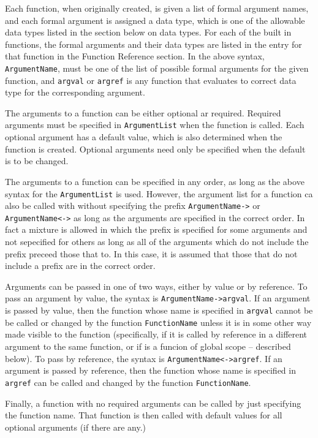 Each function, when originally created, is given a list of formal
argument names, and each formal argument is assigned a data type,
which is one of the allowable data types listed in the section below
on data types.  For each of the built in functions, the formal
arguments and their data types are listed in the entry for that
function in the Function Reference section.  In the above syntax,
\verb+ArgumentName+, must be one of the list of possible formal
arguments for the given function, and \verb+argval+ or \verb+argref+
is any function that evaluates to correct data type for the
corresponding argument. 

The arguments to a function can be either optional ar required.
Required arguments must be specified in \verb+ArgumentList+ when the
function is called.  Each optional argument has a default value, which
is also determined when the function is created.  Optional arguments
need only be specified when the default is to be changed.

The arguments to a function can be specified in any order, as long as
the above syntax for the \verb+ArgumentList+ is used.  However, the
argument list for a function ca also be called with without specifying
the prefix \verb+ArgumentName->+ or \verb+ArgumentName<->+ as long as
the arguments are specified in the correct order.  In fact a mixture
is allowed in which the prefix is specified for some arguments and not
sepecified for others as long as all of the arguments which do not
include the prefix preceed those that to.  In this case, it is assumed
that those that do not include a prefix are in the correct order.  

Arguments can be passed in one of two ways, either by value or by
reference.  To pass an argument by value, the syntax is
\verb+ArgumentName->argval+.  If an argument is passed by value, then the
function whose name is specified in \verb+argval+ cannot be be called
or changed by the function \verb+FunctionName+ unless it is in some
other way made visible to the function (specifically, if it is called
by reference in a different argument to the same function, or if is a
funcion of global scope -- described below).  To pass by reference,
the syntax is \verb+ArgumentName<->argref+.  If an argument is passed
by reference, then the function whose name is specified in
\verb+argref+ can be called and changed by the function
\verb+FunctionName+.  

Finally, a function with no required arguments can be called by just
specifying the function name.  That function is then called with
default values for all optional arguments (if there are any.)

